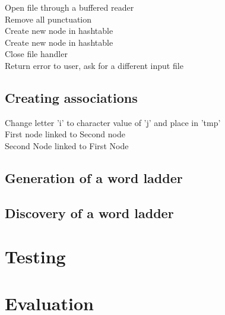 \documentclass[10pt, a4paper]{article}
\begin{document}
\begin{algorithm}[H]
\SetAlgoLined
	 {
		Open file through a buffered reader \\
		 {
			Remove all punctuation \\
			 {
				Create new node in hashtable \\
			} {
				 {
					Create new node in hashtable\\
				}
			}
		}
		Close file handler\\
	} {
		Return error to user, ask for a different input file\\
	}

\end{algorithm}

\subsection{Creating associations}

\begin{algorithm}[H]
\SetAlgoLined
	 {
		 {
			 {
				Change letter 'i' to character value of 'j' and place in 'tmp'\\
				 {
					First node linked to Second node\\
					Second Node linked to First Node\\
				}
			}
		}
	}
\end{algorithm}

\subsection{Generation of a word ladder}

\subsection{Discovery of a word ladder}

\section{Testing}

\section{Evaluation}
\end{document}
